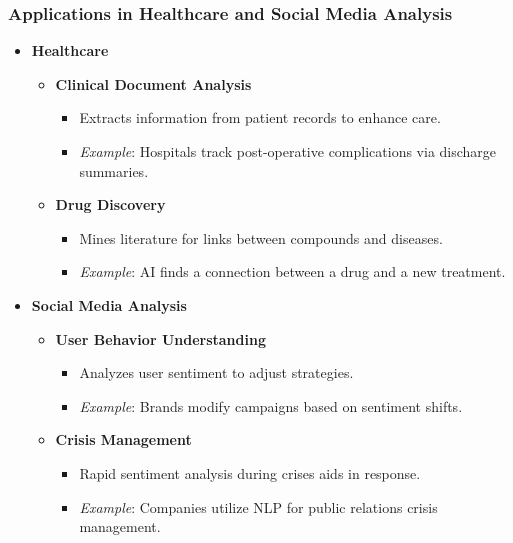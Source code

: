 \documentclass[aspectratio=169]{beamer}
\begin{document}
\begin{frame}[fragile]
    \frametitle{Applications in Healthcare and Social Media Analysis}
    \begin{itemize}
        \item \textbf{Healthcare}
            \begin{itemize}
                \item \textbf{Clinical Document Analysis}
                    \begin{itemize}
                        \item Extracts information from patient records to enhance care.
                        \item \textit{Example}: Hospitals track post-operative complications via discharge summaries.
                    \end{itemize}
                \item \textbf{Drug Discovery}
                    \begin{itemize}
                        \item Mines literature for links between compounds and diseases.
                        \item \textit{Example}: AI finds a connection between a drug and a new treatment.
                    \end{itemize}
            \end{itemize}
        \item \textbf{Social Media Analysis}
            \begin{itemize}
                \item \textbf{User Behavior Understanding}
                    \begin{itemize}
                        \item Analyzes user sentiment to adjust strategies.
                        \item \textit{Example}: Brands modify campaigns based on sentiment shifts.
                    \end{itemize}
                \item \textbf{Crisis Management}
                    \begin{itemize}
                        \item Rapid sentiment analysis during crises aids in response.
                        \item \textit{Example}: Companies utilize NLP for public relations crisis management.
                    \end{itemize}
            \end{itemize}
    \end{itemize}
\end{frame}
\end{document}
